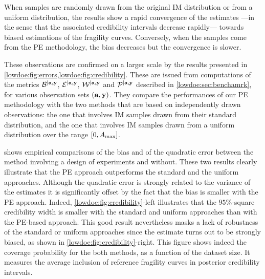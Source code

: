 
When samples are randomly drawn from the original IM distribution {or from a uniform distribution}, the results show a rapid convergence of the estimates ---in the sense that the associated credibility intervals decrease rapidly--- towards biased estimations of the fragility curves. Conversely, when the samples come from the PE methodology, the bias decreases but the convergence is slower.

These observations are confirmed on a larger scale by the results presented in \cref{lowdoe:fig:errors,lowdoe:fig:credibility}. 
These are issued from computations of the metrics $\mathcal{B}^{|\mathbf{a},\mathbf{y}}$, $\mathcal{E}^{|\mathbf{a},\mathbf{y}}$, $\mathcal{W}^{|\mathbf{a},\mathbf{y}}$ and $\mathcal{P}^{|\mathbf{a},\mathbf{y}}$ described in \cref{lowdoe:sec:benchamrk}, for various observation sets $(\mathbf{a},\mathbf{y})$. They compare the performances of our PE methodology with the two methods that are based on independently drawn observations: the one that involves  IM samples drawn from their standard distribution, and the one that involves IM samples drawn from a uniform distribution over the range $[0,A_{\rm max}]$.

 shows empirical comparisons of the bias and of the quadratic error between the method involving a design of experiments and without. These two results clearly illustrate that the PE approach outperforms the standard {and the uniform} approaches. Although the quadratic error is strongly related to the variance of the estimates it is significantly offset by the fact that the bias is smaller with the PE approach. Indeed, \cref{lowdoe:fig:credibility}-left illustrates that the $95\%$-square credibility width is smaller with the standard {and uniform} approaches than with the PE-based approach. This good result nevertheless masks a lack of robustness of the standard {or uniform}  approaches since the estimate turns out to be strongly biased, as shown in \cref{lowdoe:fig:credibility}-right. This figure shows indeed the coverage probability for the both methods, as a function of the dataset size. %
It measures the average inclusion of reference fragility curves in posterior credibility intervals.


